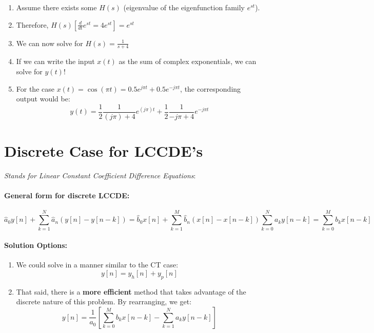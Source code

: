 \documentclass[a4paper,12pt]{report}
\begin{document}
\begin{enumerate}
\item Assume there exists some $H(s)$ (eigenvalue of the eigenfunction family $e^{st}$). 
\item Therefore, $H(s) [\frac{d}{dt} e^{st} = 4e^{st}] = e^{st}$
\item We can now solve for $H(s) = \frac{1}{s+4}$
\item If we can write the input $x(t)$ as the sum of complex exponentials, we can solve for $y(t)$!
\item For the case $x(t) = \cos(\pi t) = 0.5 e^{j\pi t} + 0.5 e^{-j\pi t}$, the corresponding output would be: 
\begin{equation}
y(t) = \frac{1}{2} \frac{1}{(j\pi)+4} e^{(j\pi)t} + \frac{1}{2} \frac{1}{-j\pi+4} e^{-j\pi t}
\end{equation}
\end{enumerate}




\section{Discrete Case for LCCDE's}

\textit{Stands for Linear Constant Coefficient Difference Equations}: 

\paragraph{General form for discrete LCCDE: } 

\begin{equation}
\hat{a}_0 y[n] + \sum_{k=1}^N \hat{a}_n (y[n] - y[n-k]) = \hat{b}_0 x[n] + \sum_{k=1}^M \hat{b}_n(x[n] - x[n-k])
\sum_{k=0}^N a_k y[n-k] = \sum_{k=0}^M b_k x[n-k]
\end{equation}

\paragraph{Solution Options: } 
\begin{enumerate}
\item We could solve in a manner similar to the CT case: 
\begin{equation}
y[n] = y_h[n] + y_p[n]
\end{equation}

\item That said, there is a \textbf{more efficient} method that takes advantage of the discrete nature of this problem. By rearranging, we get: 
\begin{equation}
y[n] = \frac{1}{a_0} [\sum_{k=0}^M b_k x[n-k] - \sum_{k=1}^N a_k y[n-k]]
\end{equation}
\end{enumerate}
\end{document}
